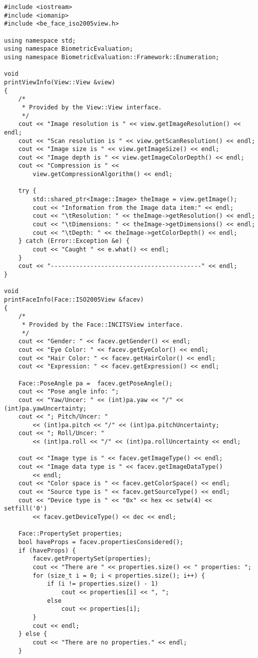\begin{lstlisting}[caption={Using the Face::ISO2005View Class}, label=lst:isofaceuse]
#include <iostream>
#include <iomanip>
#include <be_face_iso2005view.h>

using namespace std;
using namespace BiometricEvaluation;
using namespace BiometricEvaluation::Framework::Enumeration;

void
printViewInfo(View::View &view)
{
	/*
	 * Provided by the View::View interface.
	 */
	cout << "Image resolution is " << view.getImageResolution() << endl;
	cout << "Scan resolution is " << view.getScanResolution() << endl;
	cout << "Image size is " << view.getImageSize() << endl;
	cout << "Image depth is " << view.getImageColorDepth() << endl;
	cout << "Compression is " <<
	    view.getCompressionAlgorithm() << endl;

	try {
		std::shared_ptr<Image::Image> theImage = view.getImage();
		cout << "Information from the Image data item:" << endl;
		cout << "\tResolution: " << theImage->getResolution() << endl;
		cout << "\tDimensions: " << theImage->getDimensions() << endl;
		cout << "\tDepth: " << theImage->getColorDepth() << endl;
	} catch (Error::Exception &e) {
		cout << "Caught " << e.what() << endl;
	}
	cout << "------------------------------------------" << endl;
}

void
printFaceInfo(Face::ISO2005View &facev)
{
	/*
	 * Provided by the Face::INCITSView interface.
	 */
	cout << "Gender: " << facev.getGender() << endl;
	cout << "Eye Color: " << facev.getEyeColor() << endl;
	cout << "Hair Color: " << facev.getHairColor() << endl;
	cout << "Expression: " << facev.getExpression() << endl;

	Face::PoseAngle pa =  facev.getPoseAngle();
	cout << "Pose angle info: ";
	cout << "Yaw/Uncer: " << (int)pa.yaw << "/" << (int)pa.yawUncertainty;
	cout << "; Pitch/Uncer: "
	    << (int)pa.pitch << "/" << (int)pa.pitchUncertainty;
	cout << "; Roll/Uncer: "
	    << (int)pa.roll << "/" << (int)pa.rollUncertainty << endl;

	cout << "Image type is " << facev.getImageType() << endl;
	cout << "Image data type is " << facev.getImageDataType()
	    << endl;
	cout << "Color space is " << facev.getColorSpace() << endl;
	cout << "Source type is " << facev.getSourceType() << endl;
	cout << "Device type is " << "0x" << hex << setw(4) << setfill('0')
	    << facev.getDeviceType() << dec << endl;

	Face::PropertySet properties;
	bool haveProps = facev.propertiesConsidered();
	if (haveProps) {
		facev.getPropertySet(properties);
		cout << "There are " << properties.size() << " properties: ";
		for (size_t i = 0; i < properties.size(); i++) {
			if (i != properties.size() - 1)
				cout << properties[i] << ", ";
			else
				cout << properties[i];
		}
		cout << endl;
	} else {
		cout << "There are no properties." << endl;
	}


\end{lstlisting}
